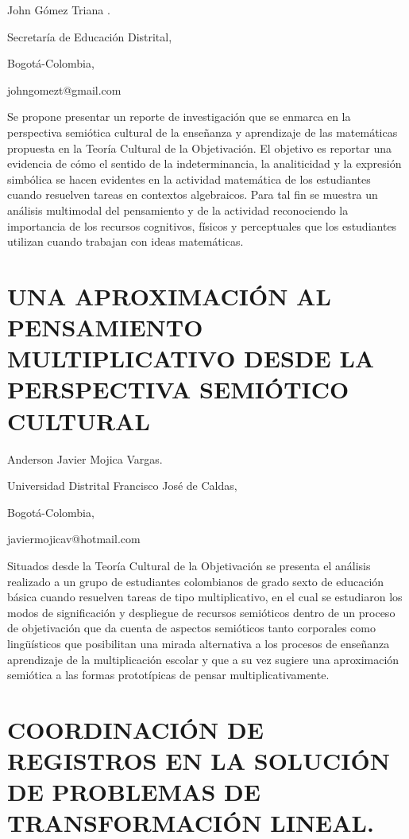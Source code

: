 \begin{datos}

John Gómez Triana .

Secretaría de Educación Distrital,

Bogotá-Colombia,

johngomezt@gmail.com

\end{datos}

Se propone presentar un reporte de investigación que se enmarca en
la perspectiva semiótica cultural de la enseñanza y aprendizaje de
las matemáticas propuesta en la Teoría Cultural de la Objetivación.
El objetivo es reportar una evidencia de cómo el sentido de la indeterminancia,
la analiticidad y la expresión simbólica se hacen evidentes en la
actividad matemática de los estudiantes cuando resuelven tareas en
contextos algebraicos. Para tal fin se muestra un análisis multimodal
del pensamiento y de la actividad reconociendo la importancia de los
recursos cognitivos, físicos y perceptuales que los estudiantes utilizan
cuando trabajan con ideas matemáticas. 


\section{UNA APROXIMACIÓN AL PENSAMIENTO MULTIPLICATIVO DESDE LA PERSPECTIVA
SEMIÓTICO CULTURAL }

\begin{datos}

Anderson Javier Mojica Vargas.

Universidad Distrital Francisco José de Caldas,

Bogotá-Colombia,

javiermojicav@hotmail.com 

\end{datos}

Situados desde la Teoría Cultural de la Objetivación se presenta el
análisis realizado a un grupo de estudiantes colombianos de grado
sexto de educación básica cuando resuelven tareas de tipo multiplicativo,
en el cual se estudiaron los modos de significación y despliegue de
recursos semióticos dentro de un proceso de objetivación que da cuenta
de aspectos semióticos tanto corporales como lingüísticos que posibilitan
una mirada alternativa a los procesos de enseñanza aprendizaje de
la multiplicación escolar y que a su vez sugiere una aproximación
semiótica a las formas prototípicas de pensar multiplicativamente.


\section{\uppercase{ Coordinación de registros en la solución de problemas
de transformación lineal.}}

